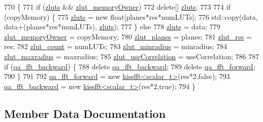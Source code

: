 \begin{DoxyCode}
770 \{
771     \textcolor{keywordflow}{if} (\hyperlink{class_c_p_u_tracker_ac187d3124a66c6743c2037bb82d9a67d}{zluts} && \hyperlink{class_c_p_u_tracker_a52fb6848573fc603a4e6e435e3e2352f}{zlut\_memoryOwner})
772         \textcolor{keyword}{delete}[] \hyperlink{class_c_p_u_tracker_ac187d3124a66c6743c2037bb82d9a67d}{zluts};
773     
774     \textcolor{keywordflow}{if} (copyMemory) \{
775         \hyperlink{class_c_p_u_tracker_ac187d3124a66c6743c2037bb82d9a67d}{zluts} = \textcolor{keyword}{new} \textcolor{keywordtype}{float}[planes*res*numLUTs];
776         std::copy(data, data+(planes*res*numLUTs), \hyperlink{class_c_p_u_tracker_ac187d3124a66c6743c2037bb82d9a67d}{zluts});
777     \} \textcolor{keywordflow}{else}
778         \hyperlink{class_c_p_u_tracker_ac187d3124a66c6743c2037bb82d9a67d}{zluts} = data;
779     \hyperlink{class_c_p_u_tracker_a52fb6848573fc603a4e6e435e3e2352f}{zlut\_memoryOwner} = copyMemory;
780     \hyperlink{class_c_p_u_tracker_ad28d60ad587ae3f89b9dba7f82c135f7}{zlut\_planes} = planes;
781     \hyperlink{class_c_p_u_tracker_a058eae282c9bf847cd8e39664688c5bc}{zlut\_res} = res;
782     \hyperlink{class_c_p_u_tracker_a492dd4655d741df0d4d1bb51c52bcca2}{zlut\_count} = numLUTs;
783     \hyperlink{class_c_p_u_tracker_a18ed4e4c7e10ea5728eaf4d36b864fdc}{zlut\_minradius} = minradius;
784     \hyperlink{class_c_p_u_tracker_aac96fa28c0ee4462e176e78c9ec91335}{zlut\_maxradius} = maxradius;
785     \hyperlink{class_c_p_u_tracker_a324e4b9cfe1337d9c33bf9690e6c1ef6}{zlut\_useCorrelation} = useCorrelation;
786 
787     \textcolor{keywordflow}{if} (\hyperlink{class_c_p_u_tracker_aca16d9dc92365498d092b937d6959d7e}{qa\_fft\_backward}) \{
788         \textcolor{keyword}{delete} \hyperlink{class_c_p_u_tracker_aca16d9dc92365498d092b937d6959d7e}{qa\_fft\_backward};
789         \textcolor{keyword}{delete} \hyperlink{class_c_p_u_tracker_af3a10b319bc4de18d2429f9e30544c4a}{qa\_fft\_forward};
790     \}
791 
792     \hyperlink{class_c_p_u_tracker_af3a10b319bc4de18d2429f9e30544c4a}{qa\_fft\_forward} = \textcolor{keyword}{new} \hyperlink{classkissfft}{kissfft<scalar\_t>}(res*2,\textcolor{keyword}{false});
793     \hyperlink{class_c_p_u_tracker_aca16d9dc92365498d092b937d6959d7e}{qa\_fft\_backward} = \textcolor{keyword}{new} \hyperlink{classkissfft}{kissfft<scalar\_t>}(res*2,\textcolor{keyword}{true});
794 \}
\end{DoxyCode}


\subsection{Member Data Documentation}
